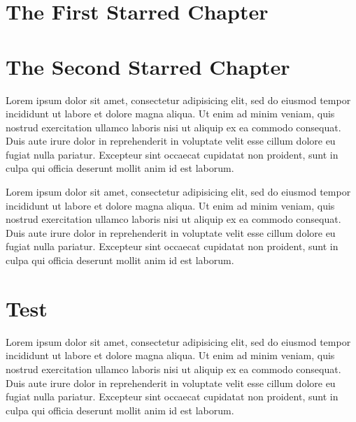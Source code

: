 \documentclass[10pt,a4paper,extrafontsizes,oldfontcommands,oneside]{memoir}
\begin{document}

\printglossary[title=List of Notations, toctitle=List of Notations]


\printglossary[type=\acronymtype,title=List of Acronyms, toctitle=List of Acronyms]


\clearpage


\mainmatter

\chapter*{The First Starred Chapter} %
\label{chap:the_first_starred_chapter}


\chapter*{The Second Starred Chapter} %
\label{chap:the_second_starred_chapter}

Lorem ipsum dolor sit amet, consectetur adipisicing elit, sed do eiusmod tempor incididunt ut labore et dolore magna aliqua. Ut enim ad minim veniam, quis nostrud exercitation ullamco laboris nisi ut aliquip ex ea commodo consequat. Duis aute irure dolor in reprehenderit in voluptate velit esse cillum dolore eu fugiat nulla pariatur. Excepteur sint occaecat cupidatat non proident, sunt in culpa qui officia deserunt mollit anim id est laborum.

Lorem ipsum dolor sit amet, consectetur adipisicing elit, sed do eiusmod tempor incididunt ut labore et dolore magna aliqua. Ut enim ad minim veniam, quis nostrud exercitation ullamco laboris nisi ut aliquip ex ea commodo consequat. Duis aute irure dolor in reprehenderit in voluptate velit esse cillum dolore eu fugiat nulla pariatur. Excepteur sint occaecat cupidatat non proident, sunt in culpa qui officia deserunt mollit anim id est laborum.


\chapter[Test TOC][Test Header]{Test} %
\label{chap:test}

Lorem ipsum dolor sit amet, consectetur adipisicing elit, sed do eiusmod tempor incididunt ut labore et dolore magna aliqua. Ut enim ad minim veniam, quis nostrud exercitation ullamco laboris nisi ut aliquip ex ea commodo consequat. Duis aute irure dolor in reprehenderit in voluptate velit esse cillum dolore eu fugiat nulla pariatur. Excepteur sint occaecat cupidatat non proident, sunt in culpa qui officia deserunt mollit anim id est laborum.
\end{document}
